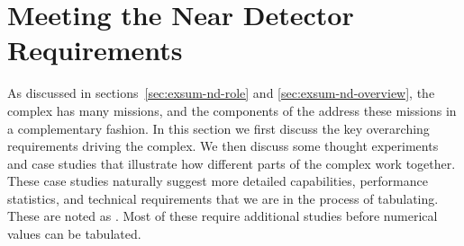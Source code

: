 


\section{Meeting the Near Detector Requirements}
\label{sec:exsum-nd-requirements}

As discussed in sections~\ref{sec:exsum-nd-role} and \ref{sec:exsum-nd-overview}, the    complex has many missions, and the components of the    address these missions in a complementary fashion. In this section we first discuss the key overarching requirements driving the  complex. We then discuss some thought experiments and case studies that illustrate how different parts of the complex work together. These case studies naturally suggest more detailed capabilities, performance statistics, and technical requirements that we are in the process of tabulating. These are noted as . Most of these require additional studies before numerical values can be tabulated.




